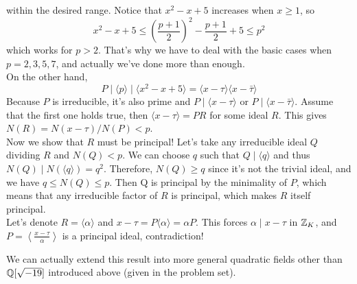 \documentclass[12pt,twoside=semi,openright,numbers=noenddot]{scrbook}
\begin{document}
within the desired range. Notice that $x^2-x+5$ increases when $x\geq 1$, so 
$$x^2-x+5 \leq \left(\frac{p+1}{2}\right)^2-\frac{p+1}{2}+5\leq p^2$$
which works for $p>2$. That's why we have to deal with the basic cases when $p=2,3,5,7$, and actually we've done more than enough. \\
On the other hand, 
$$P\mid \langle p \rangle \mid \langle x^2-x+5 \rangle = \langle x-\tau \rangle \langle x-\bar{\tau} \rangle $$
Because $P$ is irreducible, it's also prime and $P \mid \langle x-\tau \rangle $ or $P \mid \langle x-\bar{\tau} \rangle$. Assume that the first one holds true, 
then $\langle x-\tau \rangle =PR$ for some ideal $R$. This gives $N(R) = N(x-\tau)/N(P) < p$. \\
Now we show that $R$ must be principal! Let's take any irreducible ideal $Q$ dividing $R$ and $N(Q) < p$.
We can choose $q$ such that $Q \mid \langle q\rangle$ and thus $N(Q)\mid N(\langle q \rangle) = q^2$. Therefore, 
$N(Q) \geq q$ since it's not the trivial ideal, and we have $q \leq N(Q) \leq p$. Then Q is principal by the minimality of $P$, which means that 
any irreducible factor of $R$ is principal, which makes $R$ itself principal. \\
Let's denote $R = \langle \alpha \rangle$ and $x-\tau =P\langle \alpha \rangle = \alpha P$. This forces $\alpha \mid x-\tau$ in $\mathbb Z_K$, and 
$P = \left\langle \frac{x-\tau}{\alpha} \right\rangle$ is a principal ideal, contradiction!

We can actually extend this result into more general quadratic fields other than $\mathbb Q[\sqrt{-19}]$ introduced above (given in the problem set).
\end{document}
